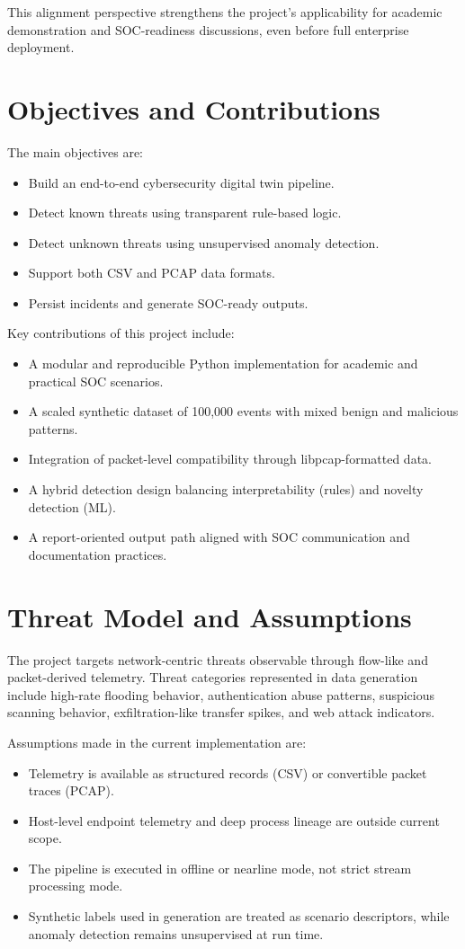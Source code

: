 \documentclass[conference]{IEEEtran}
\begin{document}
This alignment perspective strengthens the project's applicability for academic demonstration and SOC-readiness discussions, even before full enterprise deployment.

\section{Objectives and Contributions}
The main objectives are:
\begin{itemize}
    \item Build an end-to-end cybersecurity digital twin pipeline.
    \item Detect known threats using transparent rule-based logic.
    \item Detect unknown threats using unsupervised anomaly detection.
    \item Support both CSV and PCAP data formats.
    \item Persist incidents and generate SOC-ready outputs.
\end{itemize}

Key contributions of this project include:
\begin{itemize}
    \item A modular and reproducible Python implementation for academic and practical SOC scenarios.
    \item A scaled synthetic dataset of 100,000 events with mixed benign and malicious patterns.
    \item Integration of packet-level compatibility through libpcap-formatted data.
    \item A hybrid detection design balancing interpretability (rules) and novelty detection (ML).
    \item A report-oriented output path aligned with SOC communication and documentation practices.
\end{itemize}

\section{Threat Model and Assumptions}
The project targets network-centric threats observable through flow-like and packet-derived telemetry. Threat categories represented in data generation include high-rate flooding behavior, authentication abuse patterns, suspicious scanning behavior, exfiltration-like transfer spikes, and web attack indicators.

Assumptions made in the current implementation are:
\begin{itemize}
    \item Telemetry is available as structured records (CSV) or convertible packet traces (PCAP).
    \item Host-level endpoint telemetry and deep process lineage are outside current scope.
    \item The pipeline is executed in offline or nearline mode, not strict stream processing mode.
    \item Synthetic labels used in generation are treated as scenario descriptors, while anomaly detection remains unsupervised at run time.
\end{itemize}
\end{document}
